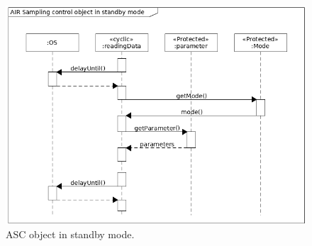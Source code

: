 \begin{figure}[H]
    \centering
    \includegraphics[height=0.9\textwidth, angle=270]{appendix/img/ASC-seq-dia-v1-2-c.png}
    \caption{ASC object in standby mode.}
    \label{ASCb}
\end{figure}
